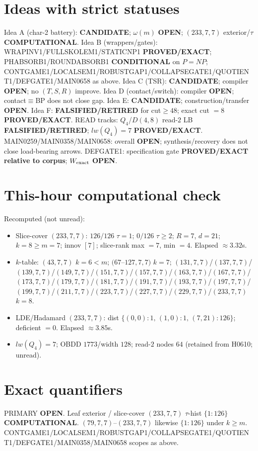 \documentclass[11pt]{article}
\begin{document}
\section*{Ideas with strict statuses}
Idea A (char-2 battery): \textbf{CANDIDATE}; $\omega(m)$ \textbf{OPEN}; $(233,7,7)$ exterior/$\tau$ \textbf{COMPUTATIONAL}.
Idea B (wrappers/gates): WRAPINV1/FULLSKOLEM1/STATICNP1 \textbf{PROVED/EXACT};
PHABSORB1/ROUNDABSORB1 \textbf{CONDITIONAL} on $P=NP$;
CONTGAME1/LOCALSEM1/ROBUSTGAP1/COLLAPSEGATE1/QUOTIENT1/DEFGATE1/MAIN0658 as above.
Idea C (TSR): \textbf{CANDIDATE}; compiler \textbf{OPEN}; no $(T,S,R)$ improve.
Idea D (contact/switch): compiler \textbf{OPEN}; contact$\equiv$BP does not close gap.
Idea E: \textbf{CANDIDATE}; construction/transfer \textbf{OPEN}.
Idea F: \textbf{FALSIFIED/RETIRED} for cut$\ge48$; exact cut $=8$ \textbf{PROVED/EXACT}.
READ tracks: $Q_4$/$D(4,8)$ read-$2$ LB \textbf{FALSIFIED/RETIRED}; $lw(Q_4)=7$ \textbf{PROVED/EXACT}.
MAIN0259/MAIN0358/MAIN0658: overall \textbf{OPEN}; synthesis/recovery does not close load-bearing arrows.
DEFGATE1: specification gate \textbf{PROVED/EXACT relative to corpus}; $W_{\rm exact}$ \textbf{OPEN}.

\section*{This-hour computational check}
Recomputed (not unread):
\begin{itemize}
\item Slice-cover $(233,7,7)$: $126/126$ $\tau{=}1$; $0/126$ $\tau{\ge}2$; $R{=}7$, $d{=}21$;
  $k{=}8{\ge}m{=}7$; innov $[7]$; slice-rank max $=7$, min $=4$. Elapsed $\approx3.32$s.
\item $k$-table: $(43,7,7)$ $k{=}6{<}m$; $(67$--$127,7,7)$ $k{=}7$;
  $(131,7,7)$/$(137,7,7)$/$(139,7,7)$/$(149,7,7)$/$(151,7,7)$/$(157,7,7)$/$(163,7,7)$/$(167,7,7)$/$(173,7,7)$/$(179,7,7)$/$(181,7,7)$/$(191,7,7)$/$(193,7,7)$/$(197,7,7)$/$(199,7,7)$/$(211,7,7)$/$(223,7,7)$/$(227,7,7)$/$(229,7,7)$/$(233,7,7)$ $k{=}8$.
\item LDE/Hadamard $(233,7,7)$: dist $\{(0,0){:}1,\,(1,0){:}1,\,(7,21){:}126\}$; deficient $=0$. Elapsed $\approx3.85$s.
\item $lw(Q_4)=7$; OBDD $1773$/width $128$; read-$2$ nodes $64$ (retained from H0610; unread).
\end{itemize}

\section*{Exact quantifiers}
PRIMARY \textbf{OPEN}. Leaf exterior / slice-cover $(233,7,7)$ $\tau$-hist $\{1{:}126\}$ \textbf{COMPUTATIONAL}.
$(79,7,7)$--$(233,7,7)$ likewise $\{1{:}126\}$ under $k{\ge}m$. CONTGAME1/LOCALSEM1/ROBUSTGAP1/COLLAPSEGATE1/QUOTIENT1/DEFGATE1/MAIN0358/MAIN0658 scopes as above.
\end{document}
